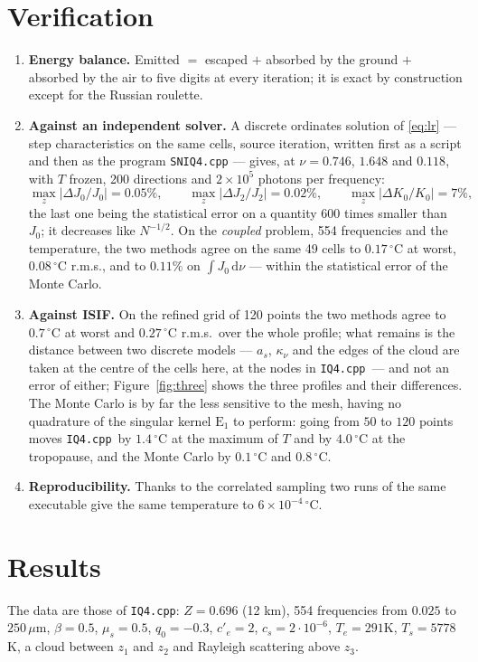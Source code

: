 \documentclass[11pt,a4paper]{article}
\renewcommand{\d}{\,\mathrm{d}}
\newcommand{\E}{\mathrm{E}}
\newcommand{\ISIF}{\texttt{IQ4.cpp}}
\begin{document}
\section{Verification}
\begin{enumerate}\itemsep2pt
\item\textbf{Energy balance.} Emitted $=$ escaped $+$ absorbed by the ground $+$ absorbed
by the air to five digits at every iteration; it is exact by construction except for the
Russian roulette.
\item\textbf{Against an independent solver.} A discrete ordinates solution
\cite{chandra,stamnes,lewis,modest} of \eqref{eq:lr} --- step characteristics on the same
cells, source iteration, written first as a script and then as the program
\texttt{SNIQ4.cpp} --- gives, at $\nu=0.746$, $1.648$ and $0.118$, with $T$ frozen,
200 directions and $2\times10^5$ photons per frequency:
\[
\max_z|\Delta J_0/J_0|=0.05\%,\qquad \max_z|\Delta J_2/J_2|=0.02\%,\qquad
\max_z|\Delta K_0/K_0|=7\%,
\]
the last one being the statistical error on a quantity $600$ times smaller than $J_0$; it
decreases like $N^{-1/2}$. On the \emph{coupled} problem, 554 frequencies and the
temperature, the two methods agree on the same 49 cells to $0.17\,^\circ$C at worst,
$0.08\,^\circ$C r.m.s., and to $0.11\%$ on $\int J_0\d\nu$ --- within the statistical error
of the Monte Carlo.
\item\textbf{Against ISIF.} On the refined grid of 120 points the two methods agree to
$0.7\,^\circ$C at worst and $0.27\,^\circ$C r.m.s.\ over the whole profile; what remains is
the distance between two discrete models --- $a_s$, $\kappa_\nu$ and the edges of the cloud
are taken at the centre of the cells here, at the nodes in \ISIF\ --- and not an error of
either; Figure~\ref{fig:three} shows the three profiles and their differences. The Monte
Carlo is by far the less sensitive to the mesh, having no quadrature of
the singular kernel $\E_1$ to perform: going from $50$ to $120$ points moves \ISIF\ by
$1.4\,^\circ$C at the maximum of $T$ and by $4.0\,^\circ$C at the tropopause, and the Monte
Carlo by $0.1\,^\circ$C and $0.8\,^\circ$C.
\item\textbf{Reproducibility.} Thanks to the correlated sampling two runs of the same
executable give the same temperature to $6\times10^{-4}\,^\circ$C.
\end{enumerate}

\section{Results}
The data are those of \ISIF: $Z=0.696$ (12 km), 554 frequencies from $0.025$ to
$250\,\mu$m, $\beta=0.5$, $\mu_s=0.5$, $q_0=-0.3$, $c'_e=2$, $c_s=2\cdot10^{-6}$,
$T_e=291$K, $T_s=5778$K, a cloud between $z_1$ and $z_2$ and Rayleigh scattering above
$z_3$.
\end{document}
